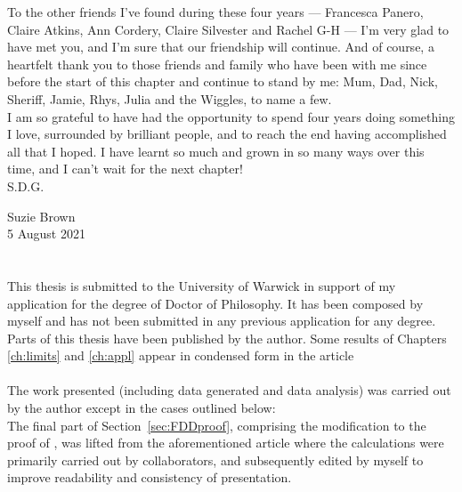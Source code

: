 \documentclass[oneside]{scrbook} %
\theoremstyle{definition}
\newcommand{\1}[1]{\mathbbm{1}_{#1}} %
\begin{document}
{To the other friends I've found during these four years --- Francesca Panero, Claire Atkins, Ann Cordery, Claire Silvester and Rachel G-H --- I'm very glad to have met you, and I'm sure that our friendship will continue.
And of course, a heartfelt thank you to those friends and family who have been with me since before the start of this chapter and continue to stand by me: Mum, Dad, Nick, Sheriff, Jamie, Rhys, Julia and the Wiggles, to name a few.
\\

I am so grateful to have had the opportunity to spend four years doing something I love, surrounded by brilliant people, and to reach the end having accomplished all that I hoped. I have learnt so much and grown in so many ways over this time, and I can't wait for the next chapter!
\\

S.D.G.
\\

\begin{flushright}
Suzie Brown\\
5 August 2021
\end{flushright}
}




%
\chapter*{} %

This thesis is submitted to the University of Warwick in support of my application for the degree of Doctor of Philosophy. It has been composed by myself and has not been submitted in any previous application for any degree.
\\[5pt]
Parts of this thesis have been published by the author.
Some results of Chapters \ref{ch:limits} and \ref{ch:appl} appear in condensed form in the article
\\
\\[5pt]
The work presented (including data generated and data analysis) was carried out by the author except in the cases outlined below:
\\
The final part of Section~\ref{sec:FDDproof}, comprising the modification to the proof of \textcite{koskela2018}, was lifted from the aforementioned article \parencite{brown2021} where the calculations were primarily carried out by collaborators, and subsequently edited by myself to improve readability and consistency of presentation.
\end{document}
